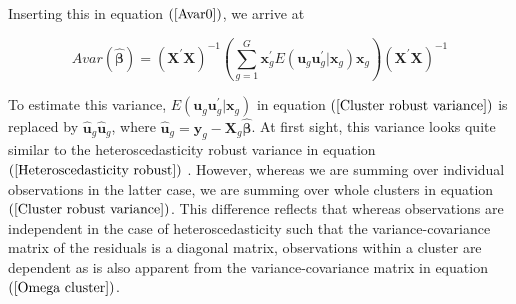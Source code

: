 \documentclass{article}
\begin{document}
Inserting this in equation $\left( \ref{Avar0}\right) $, we arrive at

\begin{equation}
Avar\left( \mathbf{\hat{\beta}}\right) =\left( \mathbf{X}^{\prime }\mathbf{X}%
\right) ^{-1}\left( \sum_{g=1}^{G}\mathbf{x}_{g}^{\prime }E\left( \mathbf{u}%
_{g}\mathbf{u}_{g}^{\prime }|\mathbf{x}_{g}\right) \mathbf{x}_{g}\right)
\left( \mathbf{X}^{\prime }\mathbf{X}\right) ^{-1}
\label{Cluster robust variance}
\end{equation}

To estimate this variance, $E\left( \mathbf{u}_{g}\mathbf{u}_{g}^{\prime }|%
\mathbf{x}_{g}\right) $ in equation $\left( \ref{Cluster robust variance}%
\right) $ is replaced by $\mathbf{\hat{u}}_{g}\mathbf{\hat{u}}_{g}$, where $%
\mathbf{\hat{u}}_{g}=\mathbf{y}_{g}-\mathbf{X}_{g}\mathbf{\hat{\beta}}$. At
first sight, this variance looks quite similar to the heteroscedasticity
robust variance in equation $\left( \ref{Heteroscedasticity robust}\right) $%
. However, whereas we are summing over individual observations in the latter
case, we are summing over whole clusters in equation $\left( \ref{Cluster
robust variance}\right) $. This difference reflects that whereas
observations are independent in the case of heteroscedasticity such that the
variance-covariance matrix of the residuals is a diagonal matrix,
observations within a cluster are dependent as is also apparent from the
variance-covariance matrix in equation $\left( \ref{Omega cluster}\right) $.
\end{document}
